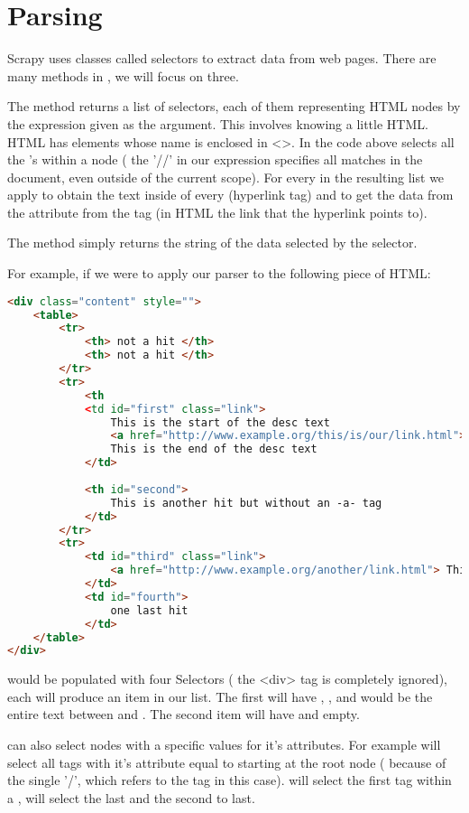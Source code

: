 \section*{Parsing}
Scrapy uses classes called selectors to extract data from web pages.
There are many methods in , we will focus on three.

The  method returns a list of selectors, each of them representing HTML nodes by the expression given as the argument. 
This involves knowing a little HTML. 
HTML has elements whose name is enclosed in <>. 
In the code above  selects  all the 's within a  node ( the '//' in our expression specifies all matches in the document, even outside of the current scope). 
For every  in the resulting list we apply  to obtain the text inside of every  (hyperlink tag) and  to get the data from the  attribute from the  tag (in HTML the link that the hyperlink points to). 

The  method simply returns the string of the data selected by the selector.

For example, if we were to apply our parser to the following piece of HTML:
\begin{lstlisting}[language=HTML]
<div class="content" style="">
	<table>
		<tr>
			<th> not a hit </th>
			<th> not a hit </th>
		</tr>
		<tr>
			<th
			<td id="first" class="link">
				This is the start of the desc text
				<a href="http://www.example.org/this/is/our/link.html"> This is our link text</a>
				This is the end of the desc text
			</td>
		
			<th id="second">
				This is another hit but without an -a- tag
			</td>
		</tr>
		<tr>
			<td id="third" class="link">
				<a href="http://www.example.org/another/link.html"> This is our link text</a>
			</td>
			<td id="fourth">
				one last hit
			</td>
	</table>
</div>
\end{lstlisting}
 would be populated with four Selectors ( the <div> tag is completely ignored), each will produce an item in our  list. 
The first will have , , and  would be the entire text between  and . 
The second item will have  and  empty.

 can also select nodes with a specific values for it's attributes. 
For example  will select all  tags with it's  attribute equal to  starting at the root node ( because of the single '/', which refers to the  tag in this case). 
 will select the first  tag within a ,  will select the last and  the second to last.

